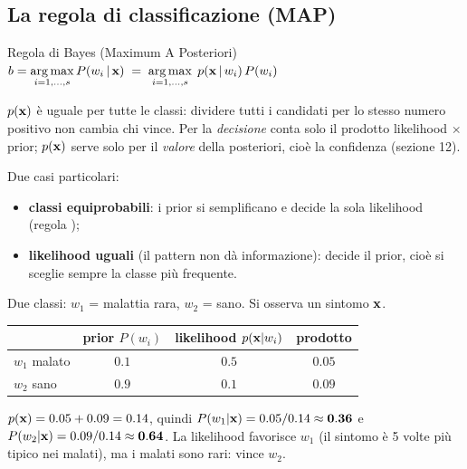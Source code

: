 \subsection{La regola di classificazione (MAP)}
\begin{formulat}{Regola di Bayes (Maximum A Posteriori)}
$\displaystyle b=\operatorname*{arg\,max}_{i=1,\dots,s} P(w_i\,|\,\mathbf{x})\;=\;\operatorname*{arg\,max}_{i=1,\dots,s}\; p(\mathbf{x}\,|\,w_i)\,P(w_i)$
\end{formulat}
\begin{tecnica}
$p(\mathbf{x})$ è uguale per tutte le classi: dividere tutti i candidati per lo stesso numero positivo non cambia chi vince. Per la \emph{decisione} conta solo il prodotto likelihood $\times$ prior; $p(\mathbf{x})$ serve solo per il \emph{valore} della posteriori, cioè la confidenza (sezione 12).
\end{tecnica}
Due casi particolari:
\begin{itemize}
  \item \textbf{classi equiprobabili}: i prior si semplificano e decide la sola likelihood (regola );
  \item \textbf{likelihood uguali} (il pattern non dà informazione): decide il prior, cioè si sceglie sempre la classe più frequente.
\end{itemize}

\begin{esempio}
Due classi: $w_1$ = malattia rara, $w_2$ = sano. Si osserva un sintomo $\mathbf{x}$.
\begin{center}
\begin{tabular}{lccc}
\toprule
& prior $P(w_i)$ & likelihood $p(\mathbf{x}|w_i)$ & prodotto\\
\midrule
$w_1$ malato & $0.1$ & $\mathbf{0.5}$ & $0.05$\\
$w_2$ sano & $0.9$ & $0.1$ & $\mathbf{0.09}$\\
\bottomrule
\end{tabular}
\end{center}
$p(\mathbf{x})=0.05+0.09=0.14$, quindi $P(w_1|\mathbf{x})=0.05/0.14\approx\mathbf{0.36}$ e $P(w_2|\mathbf{x})=0.09/0.14\approx\mathbf{0.64}$. La likelihood favorisce $w_1$ (il sintomo è 5 volte più tipico nei malati), ma i malati sono rari: vince \textbf{$w_2$}.
\end{esempio}

